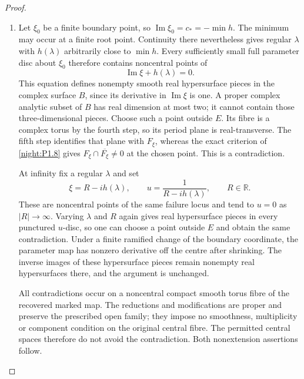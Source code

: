 \begin{proof}
\begin{enumerate}[label={$\langle1\rangle$\arabic*.}]
\item Let $\xi_0$ be a finite boundary point, so
$\operatorname{Im}\xi_0=c_*=-\min h$.
The minimum may occur at a finite root point.  Continuity
there nevertheless gives regular $\lambda$ with $h(\lambda)$
arbitrarily close to $\min h$.  Every sufficiently small full
parameter disc about $\xi_0$ therefore contains noncentral
points of
\[
 \operatorname{Im}\xi+h(\lambda)=0.
\]
This equation defines nonempty smooth real hypersurface
pieces in the complex surface $B$, since its derivative in
$\operatorname{Im}\xi$ is one.  A proper complex analytic
subset of $B$ has real dimension at most two; it cannot
contain those three-dimensional pieces.  Choose such a
point outside $E$.  Its fibre is a complex torus by the fourth
step, so its period plane is real-transverse.  The fifth step
identifies that plane with $F_\xi$, whereas the exact criterion
of \cref{night:P1.8} gives
$F_\xi\cap\overline{F_\xi}\ne0$ at the chosen point.
This is a contradiction.

At infinity fix a regular $\lambda$ and set
\[
 \xi=R-i h(\lambda),\qquad
 u=\frac1{R-i h(\lambda)},\qquad R\in\mathbb R.
\]
These are noncentral points of the same failure locus and
tend to $u=0$ as $|R|\to\infty$.  Varying $\lambda$ and $R$
again gives real hypersurface pieces in every punctured
$u$-disc, so one can choose a point outside $E$ and obtain the
same contradiction.  Under a finite ramified change of the
boundary coordinate, the parameter map has nonzero derivative
off the centre after shrinking.  The inverse images of these
hypersurface pieces remain nonempty real hypersurfaces there,
and the argument is unchanged.

All contradictions occur on a noncentral compact smooth
torus fibre of the recovered marked map.  The reductions and
modifications are proper and preserve the prescribed open
family; they impose no smoothness, multiplicity or component
condition on the original central fibre.  The permitted
central spaces therefore do not avoid the contradiction.
Both nonextension assertions follow.
\end{enumerate}
\end{proof}




